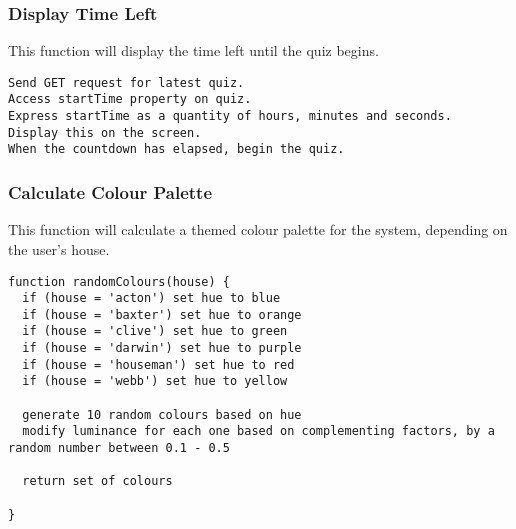 \subsubsection{Display Time Left}
This function will display the time left until the quiz begins.
\begin{verbatim}
Send GET request for latest quiz.
Access startTime property on quiz.
Express startTime as a quantity of hours, minutes and seconds.
Display this on the screen.
When the countdown has elapsed, begin the quiz.
\end{verbatim}

\subsubsection{Calculate Colour Palette}
This function will calculate a themed colour palette for the system, depending on the user's house.
\begin{verbatim}
function randomColours(house) {
  if (house = 'acton') set hue to blue
  if (house = 'baxter') set hue to orange
  if (house = 'clive') set hue to green
  if (house = 'darwin') set hue to purple
  if (house = 'houseman') set hue to red
  if (house = 'webb') set hue to yellow
  
  generate 10 random colours based on hue
  modify luminance for each one based on complementing factors, by a random number between 0.1 - 0.5
  
  return set of colours
  
}
\end{verbatim}
